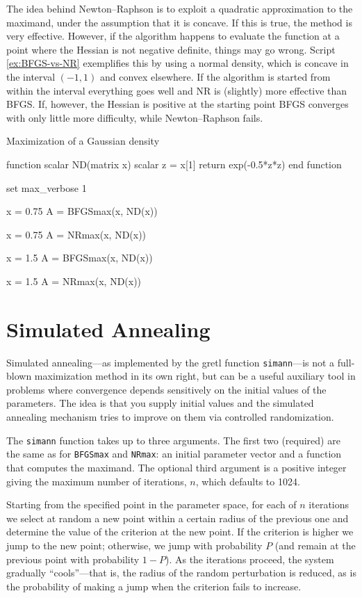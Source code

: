 The idea behind Newton--Raphson is to exploit a quadratic
approximation to the maximand, under the assumption that it is
concave. If this is true, the method is very effective. However, if
the algorithm happens to evaluate the function at a point where the
Hessian is not negative definite, things may go wrong. Script
\ref{ex:BFGS-vs-NR} exemplifies this by using a normal density, which
is concave in the interval $(-1,1)$ and convex elsewhere. If the
algorithm is started from within the interval everything goes well
and NR is (slightly) more effective than BFGS. If, however, the
Hessian is positive at the starting point BFGS converges with only
little more difficulty, while Newton--Raphson fails.

\begin{script}[htbp]
  \caption{Maximization of a Gaussian density}
  \label{ex:BFGS-vs-NR}
\begin{scode}
function scalar ND(matrix x)
    scalar z = x[1]
    return exp(-0.5*z*z)
end function

set max_verbose 1

x = {0.75}
A = BFGSmax(x, ND(x))

x = {0.75}
A = NRmax(x, ND(x))

x = {1.5}
A = BFGSmax(x, ND(x))

x = {1.5}
A = NRmax(x, ND(x))
\end{scode}
\end{script}


\section{Simulated Annealing}
\label{sec:sim-anneal}

Simulated annealing---as implemented by the gretl function
\texttt{simann}---is not a full-blown maximization method in its own
right, but can be a useful auxiliary tool in problems where
convergence depends sensitively on the initial values of the
parameters. The idea is that you supply initial values and the
simulated annealing mechanism tries to improve on them via controlled
randomization.

The \texttt{simann} function takes up to three arguments. The first
two (required) are the same as for \texttt{BFGSmax} and
\texttt{NRmax}: an initial parameter vector and a function that
computes the maximand. The optional third argument is a positive
integer giving the maximum number of iterations, $n$, which defaults
to 1024.

Starting from the specified point in the parameter space, for each of
$n$ iterations we select at random a new point within a certain radius
of the previous one and determine the value of the criterion at the
new point. If the criterion is higher we jump to the new point;
otherwise, we jump with probability $P$ (and remain at the previous
point with probability $1-P$).  As the iterations proceed, the system
gradually ``cools''---that is, the radius of the random perturbation
is reduced, as is the probability of making a jump when the criterion
fails to increase.

